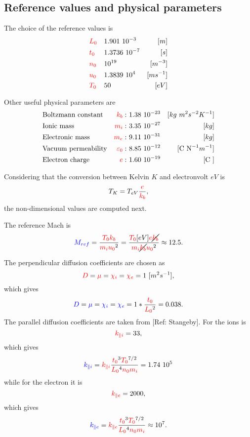 \documentclass[a4paper,10pt]{article}
\newcommand{\yd}[1]{{\color{red} #1\color{black}}} %
\newcommand{\nd}[1]{{\color{blue} #1\color{black}}} %
\def\Lz{\yd{L_0}}
\def\tz{\yd{t_0}}
\def\nz{\yd{n_0}}
\def\uz{\yd{u_0}}
\def\Tz{\yd{T_0}}
\def\Mref{\nd{M_{ref}}}
\def\kb{\yd{k_b}}
\def\mi{\yd{m_i}}
\def\e{\yd{e}}
\def\me{\yd{m_e}}
\def\kpi{\yd{k_{\parallel i}}}
\def\kpe{\yd{k_{\parallel e}}}
\def\drho{\yd{D}}
\def\dcon{\yd{\mu}}
\def\denei{\yd{\chi_i}}
\def\denee{\yd{\chi_e}}
\def\epsz{\yd{\varepsilon_0}}
\def\kpai{\nd{k_{\parallel i}}}
\def\kpae{\nd{k_{\parallel e}}}
\def\drhoa{\nd{D}}
\def\dcona{\nd{\mu}}
\def\deneai{\nd{\chi_i}}
\def\deneae{\nd{\chi_e}}
\begin{document}
\subsection{Reference values and physical parameters}
The choice of the reference values is 
 \begin{align*}
  & \Lz  && 1.901 \ 10^{-3}   & [m] \\
  & \tz  && 1.3736 \ 10^{-7}  & [s] \\
  & \nz  && 10^{19}           & [m^{-3}] \\
  & \uz  && 1.3839 \ 10^{4}   & [m s^{-1}] \\
  & \Tz  && 50                & [eV] \\
 \end{align*}

  
 Other useful physical parameters are
 \begin{align*}
 &\text{Boltzmann constant}  & \kb:                & \ 1.38 \ 10^{-23}  & [kg\ m^2 s^{-2} K^{-1} ]\\
 &\text{Ionic mass}          & \mi:                & \ 3.35 \ 10^{-27}        & [kg]\\
 &\text{Electronic mass}     & \me:                & \ 9.11 \ 10^{-31}       & [kg]\\
 &\text{Vacuum permeability} & \epsz:              & \ 8.85 \ 10^{-12}       & [\text{C } \text{N}^{-1} m^{-1}]\\
 &\text{Electron charge}     & \e:                 & \ 1.60 \ 10^{-19}       & [\text{C }]\\
\end{align*}

Considering that the conversion between Kelvin $K$ and electronvolt $eV$ is 
\begin{equation*}
 T_{K} = T_{eV}  \frac{\e}{\kb},
\end{equation*}
the non-dimensional values are computed next.  

The reference Mach is
\begin{align*}
\Mref = \frac{\Tz \kb}{\mi \uz^2} = \frac{\Tz[eV] \e \cancel{\kb}}{\mi \cancel{\kb} \uz^2} \approx 12.5. 
\end{align*}

The perpendicular diffusion coefficients are chosen as 
\[
 \drho=\dcon=\denei=\denee = 1 \ [m^2 s^{-1}],
\]
which gives 
\[
 \drhoa=\dcona=\deneai=\deneae= 1*\frac{\tz}{\Lz^2} = 0.038.
\]
The parallel diffusion coefficients are taken from [Ref: Stangeby]. For the ions is
\[
 \kpi = 33,  
\]
which gives 
\[
  \kpai = \kpi \frac{\tz^3 \Tz^{7/2}}{\Lz^4 \nz \mi} = 1.74 \ 10^5
\]
while for the electron it is
\[
 \kpe = 2000,
\]
which gives 
\[
  \kpae = \kpe \frac{\tz^3 \Tz^{7/2}}{\Lz^4 \nz \mi} \approx 10^7.
\]
\end{document}
